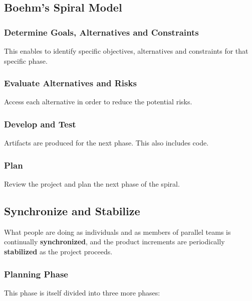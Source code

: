 \documentclass{article}
\begin{document}
\subsection{Boehm's Spiral Model}
\subsubsection{Determine Goals, Alternatives and Constraints}
This enables to identify specific objectives, alternatives and constraints for that specific phase.

\subsubsection{Evaluate Alternatives and Risks}
Access each alternative in order to reduce the potential risks.

\subsubsection{Develop and Test}
Artifacts are produced for the next phase. This also includes code.

\subsubsection{Plan}
Review the project and plan the next phase of the spiral.

\subsection{Synchronize and Stabilize}
What people are doing as individuals and as members of parallel teams is continually \textbf{synchronized}, and the product increments are periodically \textbf{stabilized} as the project proceeds.

\subsubsection{Planning Phase}
This phase is itself divided into three more phases:
\end{document}
